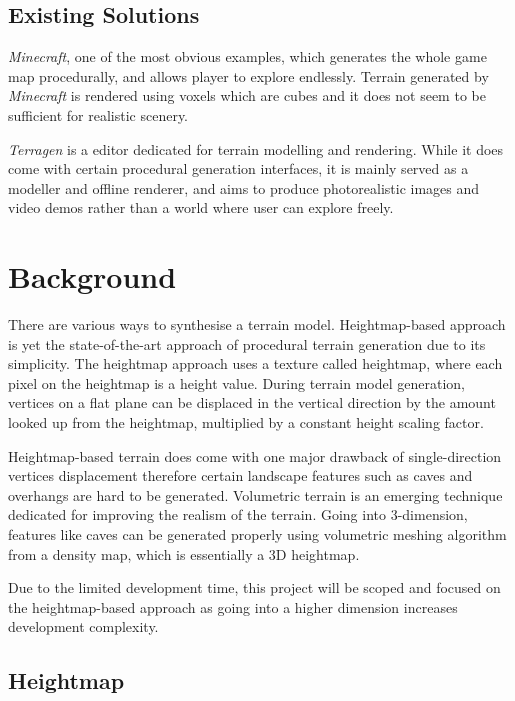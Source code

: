 \documentclass[oneside, a4paper]{report}
\begin{document}
    \subsection{Existing Solutions}

    \textit{Minecraft}, one of the most obvious examples, which generates the whole game map procedurally, and allows player to explore endlessly. Terrain generated by \textit{Minecraft} is rendered using voxels which are cubes and it does not seem to be sufficient for realistic scenery.

    \textit{Terragen} is a editor dedicated for terrain modelling and rendering. While it does come with certain procedural generation interfaces, it is mainly served as a modeller and offline renderer, and aims to produce photorealistic images and video demos rather than a world where user can explore freely.

    \section{Background}

    There are various ways to synthesise a terrain model. Heightmap-based approach is yet the state-of-the-art approach of procedural terrain generation \cite{kang_sim_han_2018} due to its simplicity. The heightmap approach uses a texture called heightmap, where each pixel on the heightmap is a height value. During terrain model generation, vertices on a flat plane can be displaced in the vertical direction by the amount looked up from the heightmap, multiplied by a constant height scaling factor.

    Heightmap-based terrain does come with one major drawback of single-direction vertices displacement therefore certain landscape features such as caves and overhangs are hard to be generated. Volumetric terrain \cite{gems3_voxel_terrain} is an emerging technique dedicated for improving the realism of the terrain. Going into 3-dimension, features like caves can be generated properly using volumetric meshing algorithm \cite{marching_cubes} from a density map, which is essentially a 3D heightmap.

    Due to the limited development time, this project will be scoped and focused on the heightmap-based approach as going into a higher dimension increases development complexity.

    \subsection{Heightmap}
\end{document}
